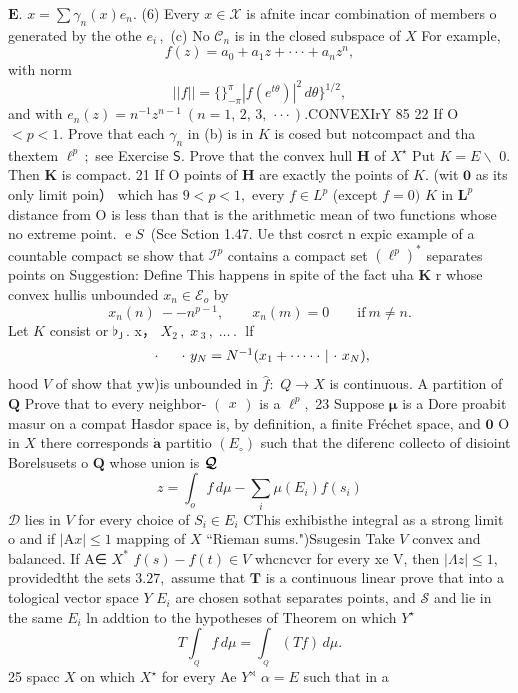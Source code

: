 ${\boldsymbol{E}}.$ $x=\sum\gamma_{n}(x)e_{n}.$ (6) Every $x\in{\mathcal{X}}$ is afnite incar combination of members o generated by the othe $e_{i}\,,$ (c) No ${\mathcal{C}}_{n}$ is in the closed subspace of $\textstyle X$ For example, $$ f(z)=a_{0}+a_{1}z+\cdot\cdot\cdot+a_{n}z^{n}, $$ with norm $$ ||f||=\biggl\{\biggl\}_{-\pi}^{\pi}|f(e^{t\theta})|^{2}\,d\theta\biggr\}^{1/2}, $$ and with $e_{n}(z)=n^{-1}z^{n-1}~(n=1,\,2,\,3,\,\cdot\cdot\cdot).$CONVEXIrY 85 22 If O $<p<1.$ Prove that each $\gamma_{n}$ in (b) is in $\textstyle K$ is cosed but notcompact and tha thextem $\ell^{p}\,;$ see Exercise ${\mathsf{S}}.$ Prove that the convex hull ${\boldsymbol{H}}$ of $X^{\star}$ Put $K=E\smallsetminus$ {0}. Then $\boldsymbol{K}$ is compact. 21 If O points of ${\boldsymbol{H}}$ are exactly the points of $K.$ (wit $\mathbf{0}$ as its only limit poin） which has $9<p<1,$ every $f\in L^{p}$ (except $f=0)$ $\textstyle K$ in ${\boldsymbol{L}}^{p}$ distance from O is less than that is the arithmetic mean of two functions whose no extreme point. $\operatorname{e}\!S\,$ (Sce Sction 1.47. Ue thst cosrct n expic example of a countable compact se show that ${\mathcal{I}}^{p}$ contains a compact set $(\ell^{p})^{*}$ separates points on Suggestion: Define This happens in spite of the fact uha $\boldsymbol{K}$ r whose convex hullis unbounded $x_{n}\in{\mathcal{E}}_{o}$ by $$ x_{n}(n)\ --n^{p-1},\qquad x_{n}(m)=0\qquad\mathrm{if~}m\neq n. $$ Let $\textstyle K$ consist or ${}\flat_{\mathsf{J}}\,.$ x， $X_{2}\,,\;x\,_{3}\,,\;\ldots\,.\;$ lf $$ \begin{array}{r l}{{\mathrm{\boldmath~\cdot~}}}&{{\mathrm{\boldmath~\cdot~}}y_{N}=N^{-1}(x_{1}+\cdots\cdot\cdot\mathrm{\boldmath~|~\cdot~}x_{N}),}\end{array} $$ hood ${\mathbf{}}V$ of show that {yw)}is unbounded in ${\hat{f}}\colon$ $Q\to X$ is continuous. A partition of ${\boldsymbol{Q}}$ Prove that to every neighbor- $\textstyle{\left(\begin{array}{l}{x}\end{array}\right)}$ is a $\ell^{p},$ 23 Suppose $\boldsymbol{\mu}$ is a Dore proabit masur on a compat Hasdor space is, by definition, a finite Fréchet space, and $\mathbf{0}$ O in $\textstyle X$ there corresponds $\mathbf{\dot{a}}$ partitio $(E_{\circ})$ such that the diferenc collecto of disioint Borelsusets o ${\boldsymbol{Q}}$ whose union is ${\boldsymbol{\cal Q}}$ $$ z=\int_{o}f\,d\mu-\sum_{i}\mu(E_{i})f(s_{i}) $$ ${\mathcal{D}}$ lies in ${\mathbf{}}V$ for every choice of $S_{i}\in E_{i}$ CThis exhibisthe integral as a strong limit o and if $|\mathrm{A}x|\leq1$ mapping of $\textstyle X$ “Rieman sums.")Ssugesin Take ${\mathit{V}}$ convex and balanced. If A∈ $X^{\ast}$ $f(s)-f(t)\in V$ whcncvcr for every xe V, then $\vert\Lambda z\vert\leq1,$ providedtht the sets $3.27,$ assume that ${\boldsymbol{T}}$ is a continuous linear prove that into a tological vector space ${\mathbf{}}Y$ $\textstyle E_{i}$ are chosen sothat separates points, and $\scriptstyle{\mathcal{S}}$ and lie in the same $E_{i}$ ln addtion to the hypotheses of Theorem on which $Y^{\star}$ $$ T\int_{_Q}f\,d\mu=\int_{_Q}(T f)\,d\mu. $$ 25 spacc $\textstyle X$ on which $X^{\star}$ for every Ae $Y^{\rtimes}$ $\alpha=E$ such that in a 